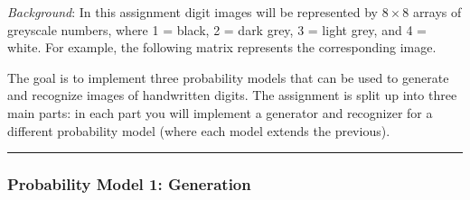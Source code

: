 \documentclass[12pt]{article}
\begin{document}
\bigskip

\noindent
{\em Background}:
In this assignment digit images will be represented by $8\times8$
arrays of greyscale numbers, where
1 = black, 2 = dark grey, 3 = light grey, and 4 = white.
For example, the following matrix represents the corresponding image.

\bigskip

\hspace*{1.5cm}
\quad

The goal is to implement three probability models that can be used
to generate and recognize images of handwritten digits.
The assignment is split up into three main parts: in each part
you will implement a generator and recognizer for a different
probability model (where each model extends the previous).

\newpage

\hrule

\subsubsection*{Probability Model 1: Generation}



\bigskip
\end{document}
